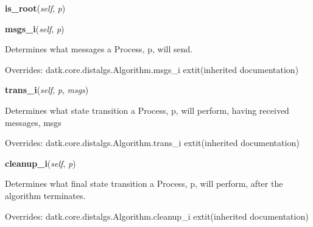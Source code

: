     \vspace{0.5ex}

\hspace{.8\funcindent}\begin{boxedminipage}{\funcwidth}

    \raggedright \textbf{is\_root}(\textit{self}, \textit{p})

\setlength{\parskip}{2ex}
\setlength{\parskip}{1ex}
    \end{boxedminipage}

    \vspace{0.5ex}

\hspace{.8\funcindent}\begin{boxedminipage}{\funcwidth}

    \raggedright \textbf{msgs\_i}(\textit{self}, \textit{p})

\setlength{\parskip}{2ex}
    Determines what messages a Process, p, will send.

\setlength{\parskip}{1ex}
      Overrides: datk.core.distalgs.Algorithm.msgs\_i 	extit{(inherited documentation)}

    \end{boxedminipage}

    \vspace{0.5ex}

\hspace{.8\funcindent}\begin{boxedminipage}{\funcwidth}

    \raggedright \textbf{trans\_i}(\textit{self}, \textit{p}, \textit{msgs})

\setlength{\parskip}{2ex}
    Determines what state transition a Process, p, will perform, having 
    received messages, msgs

\setlength{\parskip}{1ex}
      Overrides: datk.core.distalgs.Algorithm.trans\_i 	extit{(inherited documentation)}

    \end{boxedminipage}

    \vspace{0.5ex}

\hspace{.8\funcindent}\begin{boxedminipage}{\funcwidth}

    \raggedright \textbf{cleanup\_i}(\textit{self}, \textit{p})

\setlength{\parskip}{2ex}
    Determines what final state transition a Process, p, will perform, 
    after the algorithm terminates.

\setlength{\parskip}{1ex}
      Overrides: datk.core.distalgs.Algorithm.cleanup\_i 	extit{(inherited documentation)}

    \end{boxedminipage}

